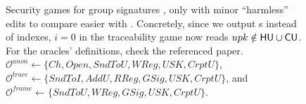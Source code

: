 \begin{figure}[ht!]
  \centering
  \caption{Security games for group signatures \cite{bsz05}, only with minor    
    ``harmless'' edits to compare easier with \CUASGS. Concretely, since we
    output {\upk}s instead of indexes, $i=0$ in the traceability game now reads
    $upk \notin \mathsf{HU} \cup \mathsf{CU}$. For the oracles' definitions, check the
    referenced paper.
    $\mathcal{O}^{anon} \gets \lbrace Ch,Open,SndToU,WReg,USK,CrptU \rbrace$,
    $\mathcal{O}^{trace} \gets \lbrace SndToI,AddU,RReg,GSig,USK,CrptU \rbrace$,
    and $\mathcal{O}^{frame} \gets \lbrace SndToU,WReg,GSig,USK,CrptU \rbrace$.
  }
  \label{fig:model-gs}  
\end{figure}

